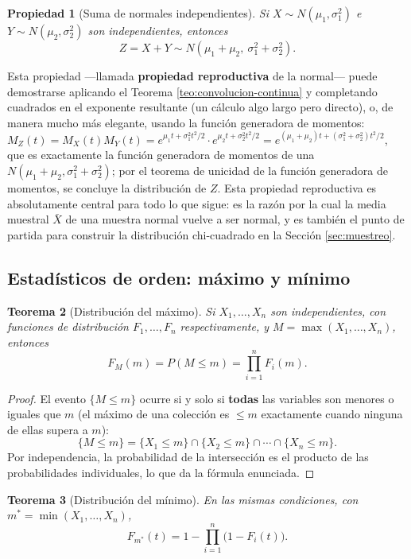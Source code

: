 \documentclass[11pt,a4paper]{article}
\theoremstyle{plain}
\newtheorem{teorema}{Teorema}[section]
\newtheorem{propiedad}[teorema]{Propiedad}
\theoremstyle{definition}
\theoremstyle{remark}
\begin{document}
\begin{propiedad}[Suma de normales independientes]\label{prop:suma-normales}
Si $X\sim N(\mu_1,\sigma_1^2)$ e $Y\sim N(\mu_2,\sigma_2^2)$ son independientes, entonces
\[
Z=X+Y \sim N(\mu_1+\mu_2,\ \sigma_1^2+\sigma_2^2).
\]
\end{propiedad}

Esta propiedad —llamada \textbf{propiedad reproductiva} de la normal— puede demostrarse aplicando el Teorema \ref{teo:convolucion-continua} y completando cuadrados en el exponente resultante (un cálculo algo largo pero directo), o, de manera mucho más elegante, usando la función generadora de momentos: $M_Z(t) = M_X(t)M_Y(t) = e^{\mu_1t+\sigma_1^2t^2/2}\cdot e^{\mu_2t+\sigma_2^2t^2/2} = e^{(\mu_1+\mu_2)t + (\sigma_1^2+\sigma_2^2)t^2/2}$, que es exactamente la función generadora de momentos de una $N(\mu_1+\mu_2,\sigma_1^2+\sigma_2^2)$; por el teorema de unicidad de la función generadora de momentos, se concluye la distribución de $Z$. Esta propiedad reproductiva es absolutamente central para todo lo que sigue: es la razón por la cual la media muestral $\bar X$ de una muestra normal vuelve a ser normal, y es también el punto de partida para construir la distribución chi-cuadrado en la Sección \ref{sec:muestreo}.

\subsection{Estadísticos de orden: máximo y mínimo}

\begin{teorema}[Distribución del máximo]\label{teo:maximo}
Si $X_1,\dots,X_n$ son independientes, con funciones de distribución $F_1,\dots,F_n$ respectivamente, y $M=\max(X_1,\dots,X_n)$, entonces
\[
F_M(m) = P(M\le m) = \prod_{i=1}^n F_i(m).
\]
\end{teorema}

\begin{proof}
El evento $\{M\le m\}$ ocurre si y solo si \textbf{todas} las variables son menores o iguales que $m$ (el máximo de una colección es $\le m$ exactamente cuando ninguna de ellas supera a $m$):
\[
\{M\le m\} = \{X_1\le m\}\cap\{X_2\le m\}\cap\cdots\cap\{X_n\le m\}.
\]
Por independencia, la probabilidad de la intersección es el producto de las probabilidades individuales, lo que da la fórmula enunciada.
\end{proof}

\begin{teorema}[Distribución del mínimo]\label{teo:minimo}
En las mismas condiciones, con $m^*=\min(X_1,\dots,X_n)$,
\[
F_{m^*}(t) = 1-\prod_{i=1}^n\big(1-F_i(t)\big).
\]
\end{teorema}
\end{document}
